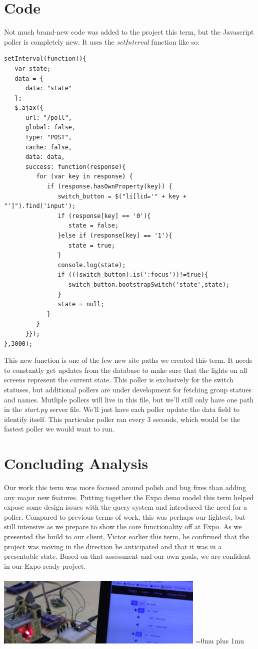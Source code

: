 \documentclass[10pt,draftclsnofoot,onecolumn]{IEEEtran}
\begin{document}
\section{Code}
Not much brand-new code was added to the project this term, but the Javascript poller is completely new. It uses the \textit{setInterval} function like so:\\
\begin{lstlisting}
setInterval(function(){
   var state;
   data = {
      data: "state"
   };
   $.ajax({
      url: "/poll",
      global: false,
      type: "POST",
      cache: false,
      data: data,
      success: function(response){
         for (var key in response) {
            if (response.hasOwnProperty(key)) {
               switch_button = $("li[lid='" + key + "']").find('input');
               if (response[key] == '0'){
                  state = false;
               }else if (response[key] == '1'){
                  state = true;
               }
               console.log(state);
               if (((switch_button).is(':focus'))!=true){
                  switch_button.bootstrapSwitch('state',state);
               }
               state = null;
            }
         }
      }});
},3000);
\end{lstlisting}
This new function is one of the few new site paths we created this term. It needs to constantly
get updates from the database to make sure that the lights on all screens represent the current
state. This poller is exclusively for the switch statuses, but additional pollers are under
development for fetching group statues and names. Mutliple pollers will live in this file,
but we'll still only have one path in the \textit{start.py} server file. We'll just have 
each poller update the data field to identify itself. This particular poller ran every 3 seconds, 
which would be the fastest poller we would want to run.
\section{Concluding Analysis}
Our work this term was more focused around polish and bug fixes than adding any major
new features. Putting together the Expo demo model this term helped expose some 
design issues with the query system and introduced the need for a poller. Compared to
previous terms of work, this was perhaps our lightest, but still intensive as we prepare
to show the core functionality off at Expo. As we presented the build to our client, Victor
earlier this term, he confirmed that the project was moving in the direction he anticipated
and that it was in a presentable state. Based on that assessment and our own goals, 
we are confident in our Expo-ready project.\\ \\ 
\includegraphics[width=0.75\textwidth]{expo.png}
 \newpage
 \Urlmuskip=0mu plus 1mu\relax
 {}
 

 
\end{document}

